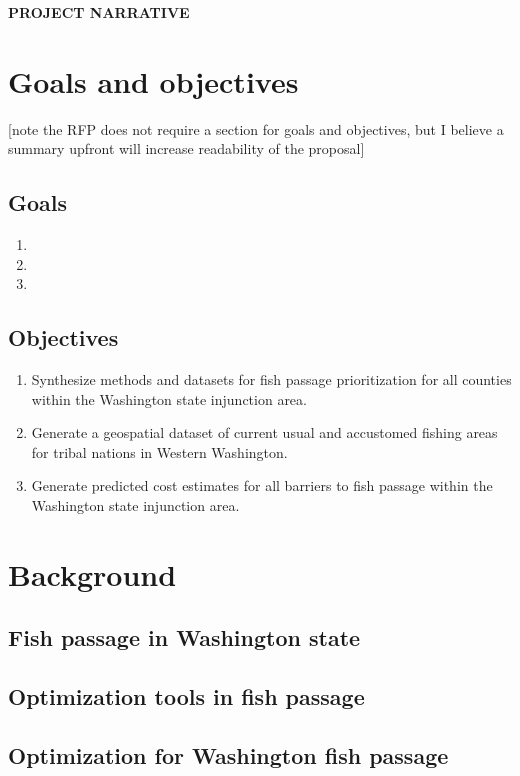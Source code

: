 \documentclass[12pt]{elsarticle}
\begin{document}
\begin{center} \textbf{PROJECT NARRATIVE} \end{center}

%
\section{Goals and objectives} [note the RFP does not require a section for goals and objectives, but I believe a summary upfront will increase readability of the proposal]
\subsection{Goals}
\begin{enumerate}
\item
\item
\item
\end{enumerate}

\subsection{Objectives}
\begin{enumerate}
\item Synthesize methods and datasets for fish passage prioritization for all counties within the Washington state injunction area.
\item Generate a geospatial dataset of current usual and accustomed fishing areas for tribal nations in Western Washington.
\item Generate predicted cost estimates for all barriers to fish passage within the Washington state injunction area. 
\end{enumerate}

%
\section{Background}
\subsection{Fish passage in Washington state}
\subsection{Optimization tools in fish passage}
\subsection{Optimization for Washington fish passage}
\end{document}
